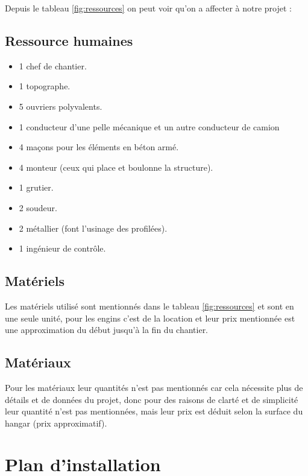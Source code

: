 \documentclass[12pt,a4paper]{report}
\begin{document}
	Depuis le tableau \ref{fig:ressources} on peut voir qu'on a affecter à notre projet :

		
	\subsection{Ressource humaines}
		
	\begin{itemize}
		\item 1 chef de chantier.
		\item 1 topographe.
		\item 5 ouvriers polyvalents.
		\item 1 conducteur d'une pelle mécanique et un autre conducteur de camion
		\item 4 maçons pour les éléments en béton armé.
		\item 4 monteur (ceux qui place et boulonne la structure).
		\item 1 grutier.
		\item 2 soudeur.
		\item 2 métallier (font l'usinage des profilées).
		\item 1 ingénieur de contrôle.
	\end{itemize}
	
	\subsection{Matériels}
	
	Les matériels utilisé sont mentionnés dans le tableau \ref{fig:ressources} et sont en une seule unité, pour les engins c'est de la location et leur prix mentionnée est une approximation du début jusqu'à la fin du chantier.
	
	\subsection{Matériaux}
	
	Pour les matériaux leur quantités n'est pas mentionnés car cela nécessite plus de détails et de données du projet, donc pour des raisons de clarté et de simplicité leur quantité n'est pas mentionnées, mais leur prix est déduit selon la surface du hangar (prix approximatif).


	
	
	
	\section{Plan d'installation}
	
\end{document}
